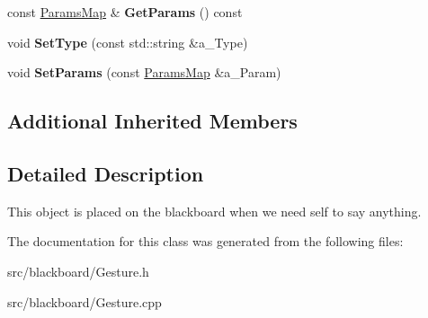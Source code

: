 \begin{DoxyCompactItemize}
\mbox{\label{class_gesture_a79d4745d74841bbf76ddd094b875ff2d}} 
const \hyperlink{class_params_map}{Params\+Map} \& {\bfseries Get\+Params} () const
\item 
\mbox{\label{class_gesture_af4c98298c644a7012d9ee45c4c1eb9dd}} 
void {\bfseries Set\+Type} (const std\+::string \&a\+\_\+\+Type)
\item 
\mbox{\label{class_gesture_aba15db55f1cce6ebc0363237b09e0e46}} 
void {\bfseries Set\+Params} (const \hyperlink{class_params_map}{Params\+Map} \&a\+\_\+\+Param)
\end{DoxyCompactItemize}
\subsection*{Additional Inherited Members}


\subsection{Detailed Description}
This object is placed on the blackboard when we need self to say anything. 

The documentation for this class was generated from the following files\+:\begin{DoxyCompactItemize}
\item 
src/blackboard/Gesture.\+h\item 
src/blackboard/Gesture.\+cpp\end{DoxyCompactItemize}
